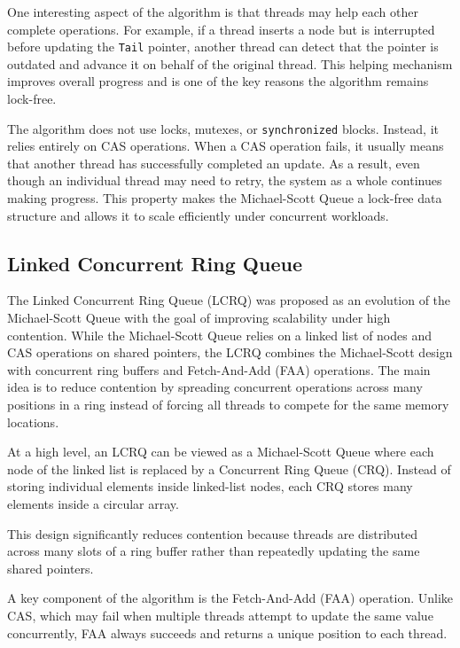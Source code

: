 One interesting aspect of the algorithm is that threads may help each other complete operations. For example, if a thread inserts a node but is interrupted before updating the \texttt{Tail} pointer, another thread can detect that the pointer is outdated and advance it on behalf of the original thread. This helping mechanism improves overall progress and is one of the key reasons the algorithm remains lock-free. \cite{michael-scott-queue}

The algorithm does not use locks, mutexes, or \texttt{synchronized} blocks. Instead, it relies entirely on CAS operations. When a CAS operation fails, it usually means that another thread has successfully completed an update. As a result, even though an individual thread may need to retry, the system as a whole continues making progress. This property makes the Michael-Scott Queue a lock-free data structure and allows it to scale efficiently under concurrent workloads. \cite{michael-scott-queue}


\subsection{Linked Concurrent Ring Queue}
The Linked Concurrent Ring Queue (LCRQ) was proposed as an evolution of the Michael-Scott Queue with the goal of improving scalability under high contention. While the Michael-Scott Queue relies on a linked list of nodes and CAS operations on shared pointers, the LCRQ combines the Michael-Scott design with concurrent ring buffers and Fetch-And-Add (FAA) operations. The main idea is to reduce contention by spreading concurrent operations across many positions in a ring instead of forcing all threads to compete for the same memory locations.

At a high level, an LCRQ can be viewed as a Michael-Scott Queue where each node of the linked list is replaced by a Concurrent Ring Queue (CRQ). Instead of storing individual elements inside linked-list nodes, each CRQ stores many elements inside a circular array. \cite{lcrq}


This design significantly reduces contention because threads are distributed across many slots of a ring buffer rather than repeatedly updating the same shared pointers. \cite{lcrq}

A key component of the algorithm is the Fetch-And-Add (FAA) operation. Unlike CAS, which may fail when multiple threads attempt to update the same value concurrently, FAA always succeeds and returns a unique position to each thread. \cite{lcrq}

